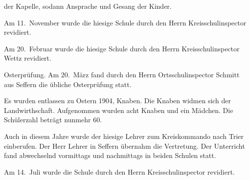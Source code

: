 

der Kapelle, sodann Ansprache und\ob
Gesang der Kinder.

\pend
{}
\pstart

Am 11.\ November wurde die hiesige Schule durch\ob
den Herrn Kreisschulinspector revidiert.

\pend
{}
\pstart

Am 20.\ Februar wurde die hiesige Schule durch\ob
den Herrn Kreisschulinspector Wettz\unsicher\ob
revidiert.

%
        Osterprüfung.\ob
Am 20.\ März fand durch den Herrn\ob
Ortsschulinspector Schmitt aus Seffern\ob
die übliche Osterprüfung statt.

\pend
{}
\pstart

Es wurden entlassen zu Ostern 1904, Knaben. Die Knaben widmen sich der\ob
Landwirthschaft. Aufgenommen wurden\ob
acht Knaben und ein Mädchen. Die\ob
Schülerzahl beträgt nunmehr 60.

\pend
{}
\pstart

Auch in diesem Jahre wurde der hiesige Lehrer\ob
zum Kreiskommando nach Trier einberufen. Der\ob
Herr Lehrer in Seffern übernahm die Vertretung.\ob
Der Unterricht fand abwechselnd vormittags\ob
und nachmittags in beiden Schulen statt.

\pend
{}
\pstart

Am 14.\ Juli wurde die Schule durch den Herrn\ob
Kreisschulinspector revidiert.
\pend
